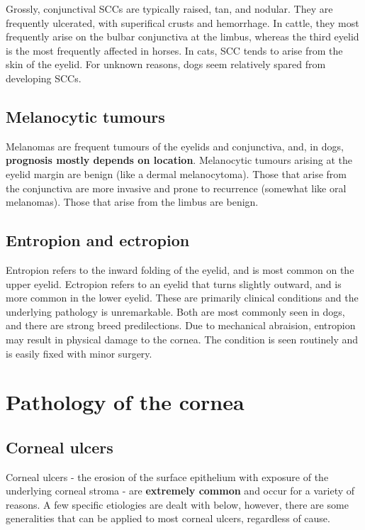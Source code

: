\documentclass[openany]{book}
\begin{document}
Grossly, conjunctival SCCs are typically raised, tan, and nodular. They
are frequently ulcerated, with superifical crusts and hemorrhage. In
cattle, they most frequently arise on the bulbar conjunctiva at the
limbus, whereas the third eyelid is the most frequently affected in
horses. In cats, SCC tends to arise from the skin of the eyelid. For
unknown reasons, dogs seem relatively spared from developing SCCs.

\section{Melanocytic tumours}\label{melanocytic-tumours}

Melanomas are frequent tumours of the eyelids and conjunctiva, and, in
dogs, \textbf{prognosis mostly depends on location}. Melanocytic tumours
arising at the eyelid margin are benign (like a dermal melanocytoma).
Those that arise from the conjunctiva are more invasive and prone to
recurrence (somewhat like oral melanomas). Those that arise from the
limbus are benign.

\hypertarget{entropion-and-ectropion}{\section{Entropion and
ectropion}\label{entropion-and-ectropion}}

Entropion refers to the inward folding of the eyelid, and is most common
on the upper eyelid. Ectropion refers to an eyelid that turns slightly
outward, and is more common in the lower eyelid. These are primarily
clinical conditions and the underlying pathology is unremarkable. Both
are most commonly seen in dogs, and there are strong breed
predilections. Due to mechanical abraision, entropion may result in
physical damage to the cornea. The condition is seen routinely and is
easily fixed with minor surgery.

\chapter{Pathology of the cornea}\label{pathology-of-the-cornea}

\section{Corneal ulcers}\label{corneal-ulcers}

Corneal ulcers - the erosion of the surface epithelium with exposure of
the underlying corneal stroma - are \textbf{extremely common} and occur
for a variety of reasons. A few specific etiologies are dealt with
below, however, there are some generalities that can be applied to most
corneal ulcers, regardless of cause.
\end{document}
